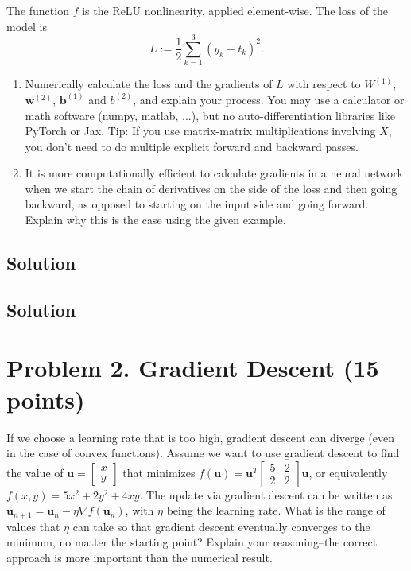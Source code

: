 \documentclass[a4paper,12pt]{article}
\begin{document}
The function $f$ is the ReLU nonlinearity, applied element-wise. The loss of the model is 
$$
    L := \frac{1}{2} \sum_{k=1}^3(y_k-t_k)^2.
$$
\begin{enumerate}
    \item Numerically calculate the loss and the gradients of $L$ with respect to $W^{(1)}$, $\mathbf{w}^{(2)}$, $\mathbf{b}^{(1)}$ and $b^{(2)}$, and explain your process.
    You may use a calculator or math software (numpy, matlab, ...), but no auto-differentiation libraries like PyTorch or Jax.
    Tip: If you use matrix-matrix multiplications involving $X$, you don't need to do multiple explicit forward and backward passes.
    \item It is more computationally efficient to calculate gradients in a neural network when we start the chain of derivatives on the side of the loss and then going backward, as opposed to starting on the input side and going forward.
    Explain why this is the case using the given example.
\end{enumerate}

\subsection{Solution}

\subsection{Solution}



\section*{Problem 2. Gradient Descent (15 points)}
If we choose a learning rate that is too high, gradient descent can diverge (even in the case of convex functions).
Assume we want to use gradient descent to find the value of $\mathbf{u} = \begin{bmatrix}
    x \\ y
\end{bmatrix}$ that minimizes $f(\mathbf{u}) = \mathbf{u}^T \begin{bmatrix}
    5 & 2 \\
    2 & 2
\end{bmatrix} \mathbf{u}$, or equivalently $f(x, y) = 5 x^2 + 2 y^2 + 4 x y$. The update via gradient descent can be written as $\mathbf{u}_{n+1} = \mathbf{u}_n - \eta \nabla f(\mathbf{u}_n)$, with $\eta$ being the learning rate. 
What is the range of values that $\eta$ can take so that gradient descent eventually converges to the minimum, no matter the starting point? Explain your reasoning–the correct approach is more important than the numerical result.  
\end{document}
